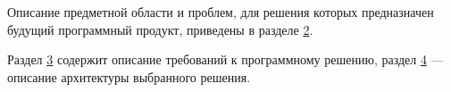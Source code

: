 		Описание предметной области и проблем, для решения которых предназначен будущий программный продукт, приведены в разделе \hyperref[chapter2]{2}.
	
		\bigskip
		
		Раздел \hyperref[chapter3]{3} содержит описание требований к программному решению, раздел \hyperref[chapter4]{4} --- описание архитектуры выбранного решения.
		